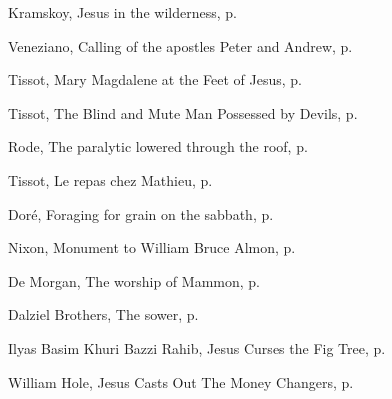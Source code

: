 \documentclass[10pt,twoside]{article} %
\newcommand{\artcredit}[3]{#2, #3, p.~\pageref{fig:#1}}
\begin{document}
\artcredit{jesus-in-wilderness}{Kramskoy}{Jesus in the wilderness}

\artcredit{fishers-of-men}{Veneziano}{Calling of the apostles Peter and Andrew}

\artcredit{mary-magdalene-at-the-feet-of-jesus}{Tissot}{Mary Magdalene at the Feet of Jesus}

\artcredit{driving-out-demons}{Tissot}{The Blind and Mute Man Possessed by Devils}

\artcredit{healing-the-paralytic}{Rode}{The paralytic lowered through the roof}

\artcredit{meal-in-house-of-matthew}{Tissot}{Le repas chez Mathieu}

\artcredit{plucking-corn-on-the-sabbath}{Doré}{Foraging for grain on the sabbath}

\artcredit{good-samaritan}{Nixon}{Monument to William Bruce Almon}

\artcredit{mammon}{De Morgan}{The worship of Mammon}

\artcredit{sower}{Dalziel Brothers}{The sower}

\artcredit{cursing-fig-tree}{Ilyas Basim Khuri Bazzi Rahib}{Jesus Curses the Fig Tree}

\artcredit{money-changers-william-hole}{William Hole}{Jesus Casts Out The Money Changers}
\end{document}
